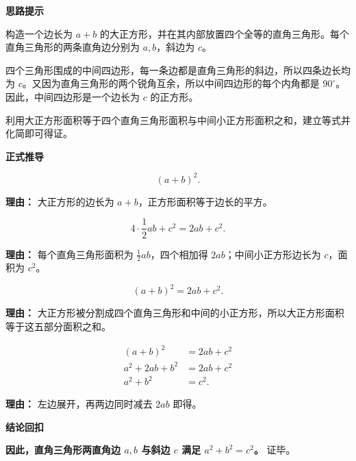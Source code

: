 \begin{proofbox}
	\textbf{\textcolor{CProof}{思路提示}}

	构造一个边长为 $a+b$ 的大正方形，并在其内部放置四个全等的直角三角形。每个直角三角形的两条直角边分别为 $a,b$，斜边为 $c$。

	四个三角形围成的中间四边形，每一条边都是直角三角形的斜边，所以四条边长均为 $c$。又因为直角三角形的两个锐角互余，所以中间四边形的每个内角都是 $90^\circ$。因此，中间四边形是一个边长为 $c$ 的正方形。

	利用大正方形面积等于四个直角三角形面积与中间小正方形面积之和，建立等式并化简即可得证。
	\medskip

	\textbf{\textcolor{CProof}{正式推导}}
	\begin{description}[style=nextline, leftmargin=2.8em, labelsep=0.5em, itemsep=0.55em]
		\item[\textbf{步骤一（求大正方形面积）：}]
		      \[
			      (a+b)^2.
		      \]
		      \par\textbf{理由：}
		      大正方形的边长为 $a+b$，正方形面积等于边长的平方。

		\item[\textbf{步骤二（求内部总面积）：}]
		      \[
			      4\cdot\frac{1}{2}ab + c^{2} = 2ab + c^{2}.
		      \]
		      \par\textbf{理由：}
		      每个直角三角形面积为 $\frac{1}{2}ab$，四个相加得 $2ab$；中间小正方形边长为 $c$，面积为 $c^{2}$。

		\item[\textbf{步骤三（列面积等式）：}]
		      \[
			      (a+b)^2 = 2ab + c^{2}.
		      \]
		      \par\textbf{理由：}
		      大正方形被分割成四个直角三角形和中间的小正方形，所以大正方形面积等于这五部分面积之和。

		\item[\textbf{步骤四（化简得结论）：}]
		      \[
			      \begin{aligned}
				      (a+b)^2         & = 2ab + c^{2} \\
				      a^{2}+2ab+b^{2} & = 2ab + c^{2} \\
				      a^{2}+b^{2}     & = c^{2}.
			      \end{aligned}
		      \]
		      \par\textbf{理由：}
		      左边展开，再两边同时减去 $2ab$ 即得。

	\end{description}
	\medskip

	\textbf{\textcolor{CProof}{结论回扣}}

	\textbf{因此，直角三角形两直角边 $a,b$ 与斜边 $c$ 满足 $a^{2}+b^{2}=c^{2}$。} 证毕。
\end{proofbox}
